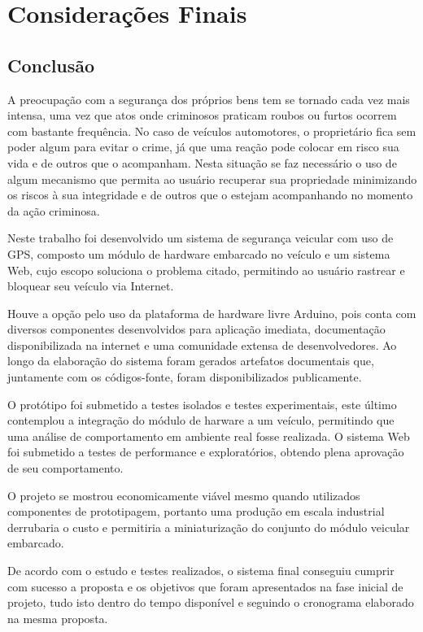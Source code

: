 \chapter{Considera\c{c}\~{o}es Finais}
\label{cap:consideracoes finais}

\section{Conclus\~{a}o}

A preocupação com a segurança dos próprios bens tem se tornado cada vez mais intensa,
uma vez que atos onde criminosos praticam roubos ou furtos ocorrem com bastante
frequência. No caso de veículos automotores, o proprietário fica sem poder algum para
evitar o crime, já que uma reação pode colocar em risco sua vida e de outros que o acompanham.
Nesta situação se faz necessário o uso de algum mecanismo que permita ao
usuário recuperar sua propriedade minimizando os riscos à sua integridade e de outros que
o estejam acompanhando no momento da ação criminosa.

Neste trabalho foi desenvolvido um sistema de segurança veicular com uso de GPS, composto um módulo de hardware embarcado no veículo e um sistema Web, cujo escopo soluciona o problema citado, permitindo ao usuário rastrear e bloquear seu veículo via Internet. 

Houve a opção pelo uso da plataforma de hardware livre Arduino, pois conta com diversos componentes desenvolvidos para aplicação imediata, documentação disponibilizada na internet e uma comunidade extensa de desenvolvedores. Ao longo da elaboração do sistema foram gerados artefatos documentais que, juntamente com os códigos-fonte, foram disponibilizados publicamente.

O protótipo foi submetido a testes isolados e testes experimentais, este último contemplou a integração do módulo de harware a um veículo, permitindo que uma análise de comportamento em ambiente real fosse realizada. O sistema Web foi submetido a testes de performance e exploratórios, obtendo plena aprovação de seu comportamento.  

O projeto se mostrou economicamente viável mesmo quando utilizados componentes de prototipagem, portanto uma produção em escala industrial derrubaria o custo e permitiria a miniaturização do conjunto do módulo veicular embarcado.

De acordo com o estudo e testes realizados, o sistema final conseguiu cumprir com sucesso a proposta e os objetivos que foram apresentados na fase inicial de projeto, tudo isto dentro do tempo disponível e seguindo o cronograma elaborado na mesma proposta.
 

